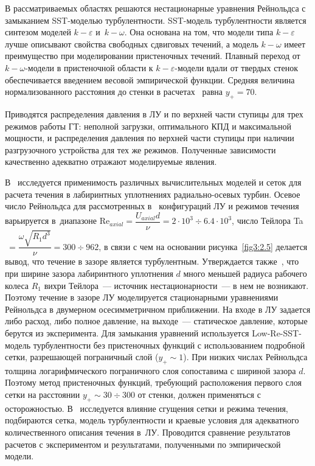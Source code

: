 В рассматриваемых областях решаются нестационарные уравнения Рейнольдса с замыканием SST-моделью 
турбулентности. SST-модель турбулентности является синтезом моделей $k-\varepsilon$ и~$k-\omega$. 
Она основана на том, что модели типа $k-\varepsilon$ лучше описывают свойства свободных сдвиговых течений, 
а модель $k-\omega$ имеет преимущество при моделировании пристеночных течений. Плавный переход 
от $k-\omega$-модели в пристеночной области к $k-\varepsilon$-модели вдали от твердых стенок обеспечивается 
введением весовой эмпирической функции. Средняя величина нормализованного расстояния до стенки в
расчетах~\cite{staubli} равна $y_+=70$.
  
Приводятся распределения давления в ЛУ и по верхней части ступицы для трех режимов работы ГТ: неполной 
загрузки, оптимального КПД и максимальной мощности, и распределения давления по верхней части ступицы при 
наличии разгрузочного устройства для тех же режимов. Полученные зависимости качественно адекватно отражают  
моделируемые явления.

В~\cite{roy_vu} исследуется применимость различных вычислительных моделей и сеток для расчета течения в 
лабиринтных уплотнениях радиально-осевых турбин.
Осевое число Рейнольдса для рассмотренных в~\cite{roy_vu} конфигураций ЛУ и режимов течения варьируется 
в~диапазоне Re$_{axial}=\dfrac{U_{axial}d}{\nu}=2\cdot10^3\div6.4\cdot10^3$,
число Тейлора Ta$~=\dfrac{\omega\sqrt{R_1d^3}}{\nu}=300\div962$, в связи с чем на основании 
рисунка~\ref{fig3:2.5} делается вывод, что течение в зазоре является 
турбулентным. Утверждается также~\cite{roy_vu}, что при ширине зазора лабиринтного уплотнения $d$ 
много меньшей радиуса рабочего колеса $R_1$ вихри Тейлора~--- источник нестационарности~--- в нем не 
возникают.
Поэтому течение в зазоре ЛУ моделируется стационарными уравнениями Рейнольдса в двумерном осесимметричном 
приближении. На входе в ЛУ задается либо расход, либо полное давление, на выходе~--- статическое давление, 
которые берутся из эксперимента. Для замыкания уравнений используется Low-Re-SST-модель
турбулентности без пристеночных функций с использованием подробной сетки, разрешающей пограничный 
слой ($y_+\sim 1$). При  низких числах Рейнольдса толщина логарифмического пограничного слоя сопоставима 
с шириной зазора $d$. Поэтому метод пристеночных функций, требующий расположения
первого слоя сетки на расстоянии $y_+\sim 30\div 300$ от стенки, должен применяться с осторожностью. 
В~\cite{roy_vu} исследуется влияние сгущения сетки и режима течения, подбираются сетка, модель турбулентности 
и краевые условия для адекватного количественного описания течения в~ЛУ.
Проводится сравнение результатов расчетов с экспериментом и результатами, полученными по эмпирической модели.

